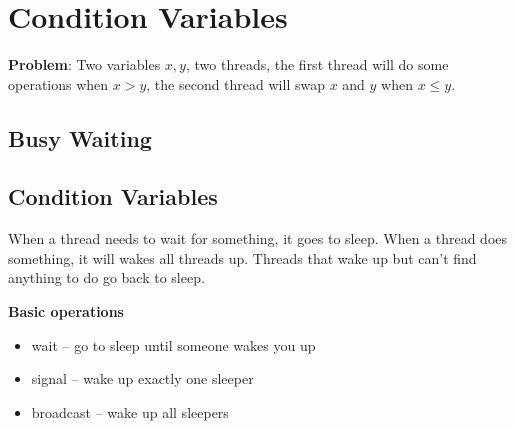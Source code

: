 \documentclass{article}
\begin{document}
\section{Condition Variables}

\textbf{Problem}: Two variables $x, y$, two threads, the first thread will do some operations when $x > y$, the second thread will swap $x$ and $y$ when $x \leq y$.

\subsection{Busy Waiting}

\begin{minipage}{\textwidth}

\begin{parcolumns}{2}


\end{parcolumns}
\end{minipage}

\subsection{Condition Variables}

When a thread needs to wait for something, it goes to sleep. When a thread does something, it will wakes all threads up. Threads that wake up but can’t find anything to do go back to sleep.

\textbf{Basic operations}

\begin{itemize}
    \item wait – go to sleep until someone wakes you up
    \item signal – wake up exactly one sleeper
    \item broadcast – wake up all sleepers
\end{itemize}
\end{document}
